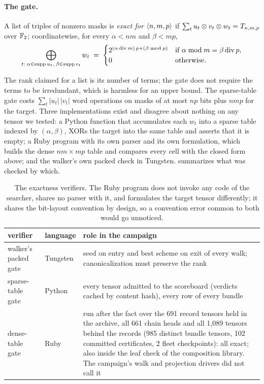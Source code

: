 \paragraph{The gate.}
\begin{definition}[exact]
A list of triples of nonzero masks is \emph{exact for $\langle n,m,p\rangle$} if $\sum_t u_t\otimes v_t\otimes w_t = T_{n,m,p}$ over ${\mathbb{F}_2}$;
coordinatewise, for every $\alpha<nm$ and $\beta<mp$,
\[
  \bigoplus_{t:\;\alpha\in\operatorname{supp} u_t,\;\beta\in\operatorname{supp} v_t} w_t \;=\;
  \begin{cases} 2^{(\alpha\,\mathrm{div}\,m)\,p+(\beta\bmod p)} & \text{if } \alpha\bmod m=\beta\,\mathrm{div}\,p,\\ 0 & \text{otherwise.}\end{cases}
\]
\end{definition}
The rank claimed for a list is its number of terms; the gate does not require the terms to be irredundant, which is harmless for an upper bound.
The sparse-table gate costs $\sum_t|u_t|\,|v_t|$ word operations on masks of at most $np$ bits plus $nmp$ for the target.
Three implementations exist and disagree about nothing on any tensor we tested: a Python function that accumulates each $w_t$ into a
sparse table indexed by $(\alpha,\beta)$, XORs the target into the same table and asserts that it is empty; a Ruby program with its own
parser and its own formulation, which builds the dense $nm\times mp$ table and compares every cell with the closed form above; and the walker's
own packed check in Tungsten.  summarizes what was checked by which.

\begin{table}[t]
\centering\small
\begin{tabular}{@{}p{3.6cm}p{2.1cm}p{7.7cm}@{}}
\toprule
verifier & language & role in the campaign\\
\midrule
walker's packed gate & Tungsten & seed on entry and best scheme on exit of every walk; canonicalization must preserve the rank\\
sparse-table gate & Python & every tensor admitted to the scoreboard (verdicts cached by content hash), every row of every bundle\\
dense-table gate & Ruby & run after the fact over the 691 record tensors held in the archive, all 661 chain heads and all 1{,}089 tensors behind the records (985 distinct bundle tensors, 102 committed certificates, 2 fleet checkpoints): all exact; also inside the leaf check of the composition library. The campaign's walk and projection drivers did not call it\\
\bottomrule
\end{tabular}
\caption{The exactness verifiers. The Ruby program does not invoke any code of the searcher, shares no parser with it, and formulates the
target tensor differently; it shares the bit-layout convention by design, so a convention error common to both would go unnoticed.}
\label{tab:verifiers}
\end{table}

